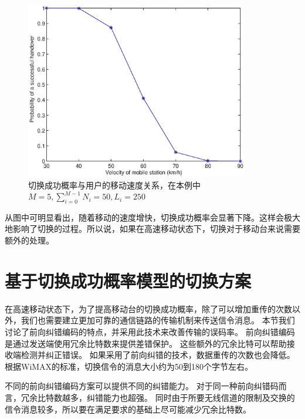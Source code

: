 \begin{figure}[t]
\begin{centering}
\includegraphics[height=7.75cm]{iccs_speed_prob_theroy}
\caption{切换成功概率与用户的移动速度关系，在本例中~$M=5, \sum_{i=0}^{M-1}N_i=50, L_i=250$~}
\label{fig:chap_iccs_handover_algorithm_Pro_V}
\end{centering}
\end{figure}

从图中可明显看出，随着移动的速度增快，切换成功概率会显著下降。这样会极大地影响了切换的过程。所以说，如果在高速移动状态下，切换对于移动台来说需要额外的处理。

\section{基于切换成功概率模型的切换方案}
在高速移动状态下，为了提高移动台的切换成功概率，除了可以增加重传的次数以外，我们也需要建立更加可靠的通信链路的传输机制来传送信令消息。
本节我们讨论了前向纠错编码的特点，并采用此技术来改善传输的误码率。
前向纠错编码是通过发送端使用冗余比特数来提供差错保护。
这些额外的冗余比特可以帮助接收端检测并纠正错误。
如果采用了前向纠错的技术，数据重传的次数也会降低。
根据WiMAX的标准，切换信令的消息大小约为50到180个字节左右。

不同的前向纠错编码方案可以提供不同的纠错能力。
对于同一种前向纠错码而言，冗余比特数越多，纠错能力也超强。
同时由于所要无线信道的限制及交换的信令消息较多，所以要在满足要求的基础上尽可能减少冗余比特数。

